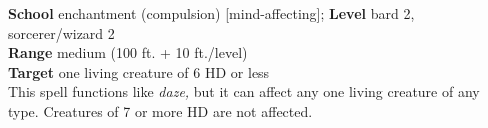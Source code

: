 \textbf{School} enchantment (compulsion) [mind-affecting]; \textbf{Level} bard 2, sorcerer/wizard 2\\
\textbf{Range }medium (100 ft. + 10 ft./level)\\
\textbf{Target }one living creature of 6 HD or less\\
This spell functions like \textit{daze, }but it can affect any one living creature of any type. Creatures of 7 or more HD are not affected.\\
